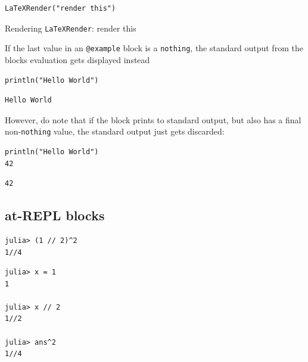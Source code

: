 \begin{verbatim}
LaTeXRender("render this")
\end{verbatim}

Rendering \texttt{LaTeXRender}: render this


If the last value in an \texttt{@example} block is a \texttt{nothing}, the standard output from the blocks{\textquotesingle} evaluation gets displayed instead




\begin{verbatim}
println("Hello World")
\end{verbatim}


\begin{verbatim}
Hello World
\end{verbatim}



However, do note that if the block prints to standard output, but also has a final non-\texttt{nothing} value, the standard output just gets discarded:




\begin{verbatim}
println("Hello World")
42
\end{verbatim}


\begin{verbatim}
42
\end{verbatim}



\subsection{at-REPL blocks}



\label{9794080512499797594}{}



\begin{verbatim}
julia> (1 // 2)^2
1//4
\end{verbatim}




\begin{verbatim}
julia> x = 1
1

julia> x // 2
1//2

julia> ans^2
1//4
\end{verbatim}



